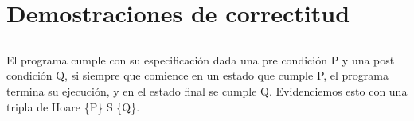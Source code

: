 \documentclass[10pt,a4paper]{article}
\begin{document}
	
	
	
	\setcounter{section}{1}
	
	\section{Demostraciones de correctitud}
	
	
	
	
	
	
	
	
	
	\subsection{}
	\noindent 
	El programa cumple con su especificación dada una pre condición P y una post condición Q, si
	siempre que comience en un estado que cumple P, el programa termina su ejecución, y en el estado 
	final se cumple Q. Evidenciemos esto con una tripla de Hoare \{P\} S \{Q\}.
	
	\vspace{0.3 cm}
	
\end{document}
